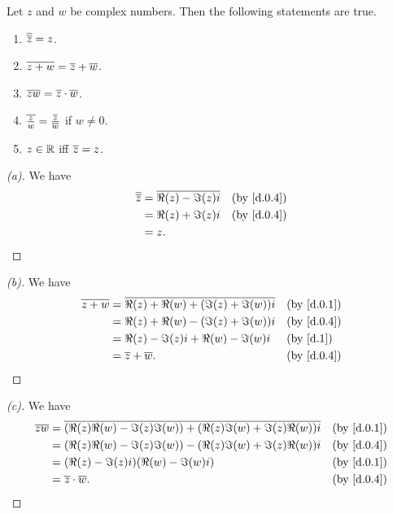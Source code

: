 \begin{thm}\label{d.2}
  Let \(z\) and \(w\) be complex numbers.
  Then the following statements are true.
  \begin{enumerate}
    \item \(\overline{\overline{z}} = z\).
    \item \(\overline{z + w} = \overline{z} + \overline{w}\).
    \item \(\overline{zw} = \overline{z} \cdot \overline{w}\).
    \item \(\overline{\frac{z}{w}} = \frac{\overline{z}}{\overline{w}}\) if \(w \neq 0\).
    \item \(z \in \mathbb{R}\) iff \(\overline{z} = z\).
  \end{enumerate}
\end{thm}

\begin{proof}[(a)]
  We have
  \begin{align*}
    \conj{\conj{z}} & = \conj{\Re(z) - \Im(z) i} &  & \by{d.0.4} \\
                    & = \Re(z) + \Im(z) i        &  & \by{d.0.4} \\
                    & = z.
  \end{align*}
\end{proof}

\begin{proof}[(b)]
  We have
  \begin{align*}
    \conj{z + w} & = \conj{\Re(z) + \Re(w) + (\Im(z) + \Im(w)) i} &  & \by{d.0.1} \\
                 & = \Re(z) + \Re(w) - (\Im(z) + \Im(w)) i        &  & \by{d.0.4} \\
                 & = \Re(z) - \Im(z) i + \Re(w) - \Im(w) i        &  & \by{d.1}   \\
                 & = \conj{z} + \conj{w}.                         &  & \by{d.0.4}
  \end{align*}
\end{proof}

\begin{proof}[(c)]
  We have
  \begin{align*}
    \conj{zw} & = \conj{(\Re(z) \Re(w) - \Im(z) \Im(w)) + (\Re(z) \Im(w) + \Im(z) \Re(w)) i} &  & \by{d.0.1} \\
              & = (\Re(z) \Re(w) - \Im(z) \Im(w)) - (\Re(z) \Im(w) + \Im(z) \Re(w)) i        &  & \by{d.0.4} \\
              & = (\Re(z) - \Im(z) i) (\Re(w) - \Im(w) i)                                    &  & \by{d.0.1} \\
              & = \conj{z} \cdot \conj{w}.                                                   &  & \by{d.0.4}
  \end{align*}
\end{proof}

